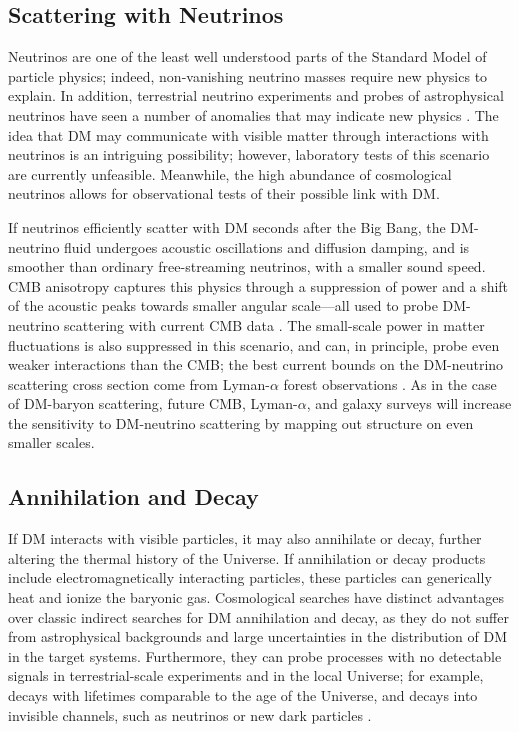 \documentclass[12pt]{article}
\begin{document}
\vspace{-0.3cm}
\subsection{Scattering with Neutrinos}

Neutrinos are one of the least well understood parts of the Standard Model of particle physics; indeed, non-vanishing neutrino masses require new physics to explain. 
In addition, terrestrial neutrino experiments and probes of astrophysical neutrinos have seen a number of anomalies that may indicate new physics \cite{Athanassopoulos:1996jb, Aguilar:2001ty,AguilarArevalo:2007it,2018arXiv180512028M,Gorham:2016zah,Gorham:2018ydl}.
The idea that DM may communicate with visible matter through interactions with neutrinos is an intriguing possibility; however, laboratory tests of this scenario are currently unfeasible.
Meanwhile, the high abundance of cosmological neutrinos allows for observational tests of their possible link with DM.

If neutrinos efficiently scatter with DM seconds after the Big Bang, the DM-neutrino fluid undergoes acoustic oscillations and diffusion damping, and is smoother than ordinary free-streaming neutrinos, with a smaller sound speed.
CMB anisotropy captures this physics through a suppression of power and a shift of the acoustic peaks towards smaller angular scale---all used to probe DM-neutrino scattering with current CMB data \cite{Mangano:2006mp,Escudero:2015yka,DiValentino:2017oaw,Diacoumis:2018ezi}.
The small-scale power in matter fluctuations is also suppressed in this scenario, and can, in principle, probe even weaker interactions than the CMB; the best current bounds on the DM-neutrino scattering cross section come from Lyman-$\alpha$ forest observations \cite{Wilkinson:2014ksa}.
As in the case of DM-baryon scattering, future CMB, Lyman-$\alpha$, and galaxy surveys will increase the sensitivity to DM-neutrino scattering by mapping out structure on even smaller scales.

\vspace{-0.3cm}
\subsection{Annihilation and Decay}

If DM interacts with visible particles, it may also annihilate or decay, further altering the thermal history of the Universe. 
If annihilation or decay products include electromagnetically interacting particles, these particles can generically heat and ionize the baryonic gas.
Cosmological searches have distinct advantages over classic indirect searches for DM annihilation and decay, as they do not suffer from astrophysical backgrounds and large uncertainties in the distribution of DM in the target systems.
Furthermore, they can probe processes with no detectable signals in terrestrial-scale experiments and in the local Universe; for example, decays with lifetimes comparable to the age of the Universe, and decays into invisible channels, such as neutrinos or new dark particles \cite{Poulin:2016nat,Poulin:2016anj}. 
\end{document}
